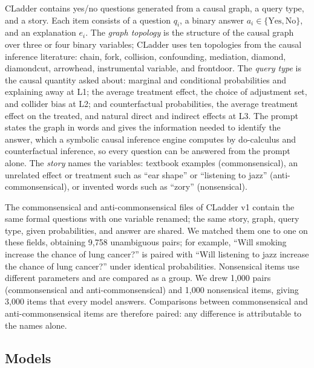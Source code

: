 \documentclass{llncs}
\begin{document}
CLadder \cite{jin2023cladder} contains yes/no questions generated from a causal graph, a query type, and a story. Each item consists of a question $q_i$, a binary answer $a_i \in \{\text{Yes},\text{No}\}$, and an explanation $e_i$. The \emph{graph topology} is the structure of the causal graph over three or four binary variables; CLadder uses ten topologies from the causal inference literature: chain, fork, collision, confounding, mediation, diamond, diamondcut, arrowhead, instrumental variable, and frontdoor. The \emph{query type} is the causal quantity asked about: marginal and conditional probabilities and explaining away at L1; the average treatment effect, the choice of adjustment set, and collider bias at L2; and counterfactual probabilities, the average treatment effect on the treated, and natural direct and indirect effects at L3. The prompt states the graph in words and gives the information needed to identify the answer, which a symbolic causal inference engine computes by do-calculus and counterfactual inference, so every question can be answered from the prompt alone. The \emph{story} names the variables: textbook examples (\textcolor{cComm}{commonsensical}), an unrelated effect or treatment such as ``ear shape'' or ``listening to jazz'' (\textcolor{cAnti}{anti-commonsensical}), or invented words such as ``zory'' (\textcolor{cNons}{nonsensical}).


The commonsensical and anti-commonsensical files of CLadder v1 contain the same formal questions with one variable renamed; the same story, graph, query type, given probabilities, and answer are shared. We matched them one to one on these fields, obtaining 9,758 unambiguous pairs; for example, ``Will smoking increase the chance of lung cancer?'' is paired with ``Will listening to jazz increase the chance of lung cancer?'' under identical probabilities. Nonsensical items use different parameters and are compared as a group. We drew 1,000 pairs (commonsensical and anti-commonsensical) and 1,000 nonsensical items, giving 3,000 items that every model answers. Comparisons between commonsensical and anti-commonsensical items are therefore paired: any difference is attributable to the names alone.

\subsection{Models}
\label{sec:models}
\end{document}
